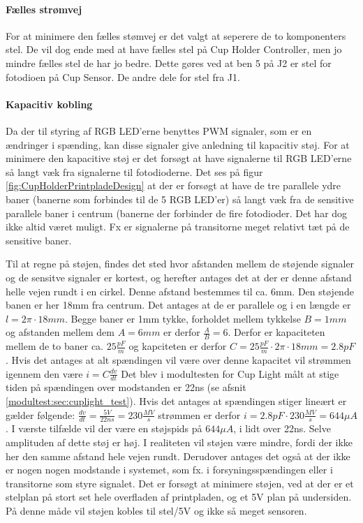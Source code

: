\documentclass[HardwareDesign/HardwareDesign_main.tex]{subfiles}
\begin{document}
\paragraph{Fælles strømvej} For at minimere den fælles stømvej er det valgt at seperere de to komponenters stel. De vil dog ende med at have fælles stel på Cup Holder Controller, men jo mindre fælles stel de har jo bedre. Dette gøres ved at ben 5 på J2 er stel for fotodioen på Cup Sensor. De andre dele for stel fra J1. 

\paragraph{Kapacitiv kobling} Da der til styring af RGB LED'erne benyttes PWM signaler, som er en ændringer i spænding, kan disse signaler give anledning til kapacitiv støj. For at minimere den kapacitive støj er det forsøgt at have signalerne til RGB LED'erne så langt væk fra signalerne til fotodioderne. Det ses på figur \ref{fig:CupHolderPrintpladeDesign} at der er forsøgt at have de tre parallele ydre baner (banerne som forbindes til de 5 RGB LED'er) så langt væk fra de sensitive parallele baner i centrum (banerne der forbinder de fire fotodioder. Det har dog ikke altid været muligt. Fx er signalerne på transitorne meget relativt tæt på de sensitive baner.

Til at regne på støjen, findes det sted hvor afstanden mellem de støjende signaler og de sensitve signaler er kortest, og herefter antages det at der er denne afstand helle vejen rundt i en cirkel. Denne afstand bestemmes til ca. 6mm. Den støjende banen er her 18mm fra centrum. Det antages at de er parallele og i en længde er $l = 2\pi\cdot18\si{mm}$. Begge baner er 1mm tykke, forholdet mellem tykkelse $B=1\si{mm}$ og afstanden mellem dem $A=6\si{mm}$ er derfor $\frac{A}{B} = 6$. Derfor er kapaciteten mellem de to baner ca. $25\si{\frac{pF}{m}}$\autocite[s. 31, figur 3.16]{FundamentalEMC1} og kapciteten er derfor $C=25\si{\frac{pF}{m}}\cdot2\pi\cdot18\si{mm} = 2.8 pF$. Hvis det antages at alt spændingen vil være over denne kapacitet vil strømmen igennem den være $i = C \frac{dv}{dt}$ Det blev i modultesten for Cup Light målt at stige tiden på spændingen over modstanden er 22ns (se afsnit \autoref{modultest:sec:cuplight_test}). Hvis det antages at spændingen stiger lineært er gælder følgende: $\frac{dv}{dt} = \frac{5\si{V}}{22\si{ns}} = 230\si{\frac{MV}{s}}$
strømmen er derfor $i = 2.8pF \cdot 230\si{\frac{MV}{s}} = 644\si{\mu A}$. I værste tilfælde vil der være en støjspids på $644\si{\mu A}$, i lidt over 22ns. Selve amplituden af dette støj er høj. I realiteten vil støjen være mindre, fordi der ikke her den samme afstand hele vejen rundt. Derudover antages det også at der ikke er nogen nogen modstande i systemet, som fx. i forsyningsspændingen eller i transitorne som styre signalet. Det er forsøgt at minimere støjen, ved at der er et stelplan på stort set hele overfladen af printpladen, og et 5V plan på undersiden. På denne måde vil støjen kobles til stel/5V og ikke så meget sensoren.
\end{document}
